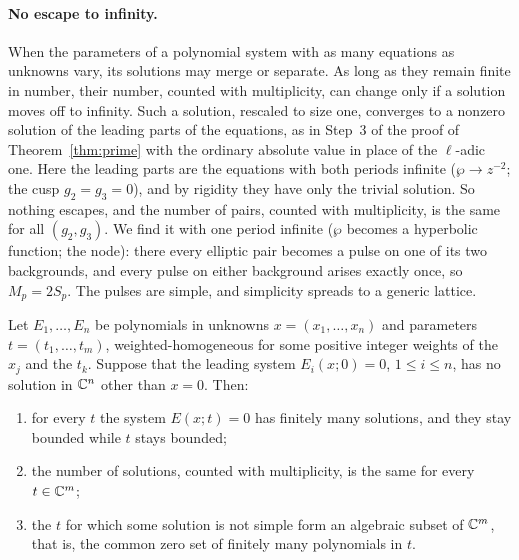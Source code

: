 \paragraph{No escape to infinity.}
When the parameters of a polynomial system with as many equations as
unknowns vary, its solutions may merge or separate. As long as they
remain finite in number, their number, counted with multiplicity, can
change only if a solution moves off to infinity. Such a solution,
rescaled to size one, converges to a nonzero solution of the leading
parts of the equations, as in Step~3 of the proof of
Theorem~\ref{thm:prime} with the ordinary absolute value in place of the
\(\ell\)-adic one. Here the leading parts are the equations with both
periods infinite (\(\wp\to z^{-2}\); the cusp \(g_2=g_3=0\)), and by
rigidity they have only the trivial solution. So nothing escapes, and
the number of pairs, counted with multiplicity, is the same for all
\((g_2,g_3)\). We find it with one period infinite (\(\wp\) becomes a
hyperbolic function; the node): there every elliptic pair becomes a
pulse on one of its two backgrounds, and every pulse on either
background arises exactly once, so \(M_p=2S_p\). The pulses are simple,
and simplicity spreads to a generic lattice.

\begin{lemma}\label{lem:conservation}
Let \(E_1,\ldots,E_n\) be polynomials in unknowns \(x=(x_1,\ldots,x_n)\)
and parameters \(t=(t_1,\ldots,t_m)\), weighted-homogeneous for some
positive integer weights of the \(x_j\) and the \(t_k\). Suppose that
the leading system \(E_i(x;0)=0\), \(1\le i\le n\), has no solution in
\(\mathbb C^n\) other than \(x=0\). Then:
\begin{enumerate}
\item[\textup{(i)}] for every \(t\) the system \(E(x;t)=0\) has finitely
many solutions, and they stay bounded while \(t\) stays bounded;
\item[\textup{(ii)}] the number of solutions, counted with multiplicity,
is the same for every \(t\in\mathbb C^m\);
\item[\textup{(iii)}] the \(t\) for which some solution is not simple
form an algebraic subset of \(\mathbb C^m\), that is, the common zero set of
finitely many polynomials in \(t\).
\end{enumerate}
\end{lemma}

